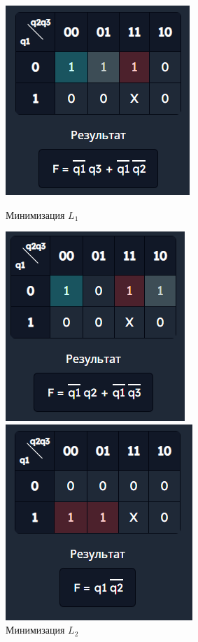 \documentclass[10pt,a4paper,final]{article} %
\begin{document}
\begin{figure}[htpb]
	\centering
	\begin{minipage}{0.25\textwidth}
		\includegraphics[scale=0.7]{img/L1.png}
		\caption{Минимизация $L_1$}
	\end{minipage}
	\hfill
	\begin{minipage}{0.25\textwidth}
		\includegraphics[scale=0.7]{img/L2.png}
		\caption{Минимизация $L_2$}
	\end{minipage}
	\hfill
	\begin{minipage}{0.25\textwidth}
		\includegraphics[scale=0.7]{img/L3.png}

\end{minipage}
\end{figure}
\end{document}
